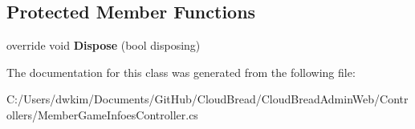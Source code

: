 \subsection*{Protected Member Functions}
\begin{DoxyCompactItemize}
\item 
override void {\bfseries Dispose} (bool disposing)\hypertarget{class_cloud_bread_admin_web_1_1_controllers_1_1_member_game_infoes_controller_a5c78044ff2101b2964c9edf001332d54}{}\label{class_cloud_bread_admin_web_1_1_controllers_1_1_member_game_infoes_controller_a5c78044ff2101b2964c9edf001332d54}

\end{DoxyCompactItemize}


The documentation for this class was generated from the following file\+:\begin{DoxyCompactItemize}
\item 
C\+:/\+Users/dwkim/\+Documents/\+Git\+Hub/\+Cloud\+Bread/\+Cloud\+Bread\+Admin\+Web/\+Controllers/Member\+Game\+Infoes\+Controller.\+cs\end{DoxyCompactItemize}
